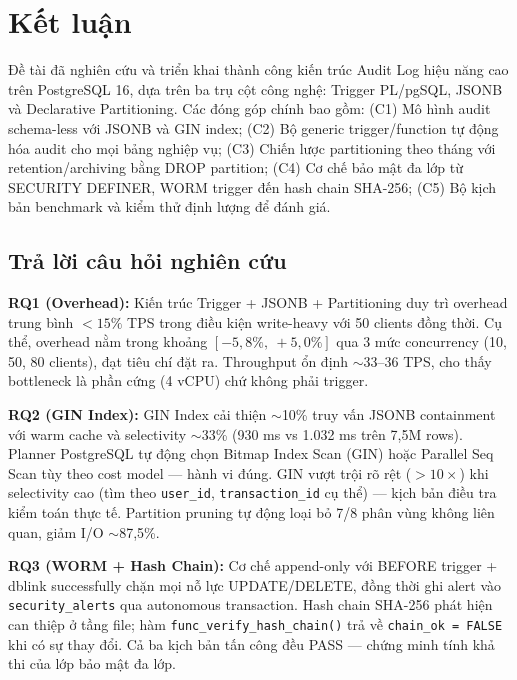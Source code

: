 \section{Kết luận}

Đề tài đã nghiên cứu và triển khai thành công kiến trúc Audit Log hiệu năng cao trên PostgreSQL 16, dựa trên ba trụ cột công nghệ: Trigger PL/pgSQL, JSONB và Declarative Partitioning. Các đóng góp chính bao gồm: (C1) Mô hình audit schema-less với JSONB và GIN index; (C2) Bộ generic trigger/function tự động hóa audit cho mọi bảng nghiệp vụ; (C3) Chiến lược partitioning theo tháng với retention/archiving bằng DROP partition; (C4) Cơ chế bảo mật đa lớp từ SECURITY DEFINER, WORM trigger đến hash chain SHA-256; (C5) Bộ kịch bản benchmark và kiểm thử định lượng để đánh giá.

\subsection{Trả lời câu hỏi nghiên cứu}

\textbf{RQ1 (Overhead):} Kiến trúc Trigger + JSONB + Partitioning duy trì overhead trung bình $< 15\%$ TPS trong điều kiện write-heavy với 50 clients đồng thời. Cụ thể, overhead nằm trong khoảng $[-5,8\%,\ +5,0\%]$ qua 3 mức concurrency (10, 50, 80 clients), đạt tiêu chí đặt ra. Throughput ổn định $\sim$33--36 TPS, cho thấy bottleneck là phần cứng (4 vCPU) chứ không phải trigger.

\textbf{RQ2 (GIN Index):} GIN Index cải thiện $\sim$10\% truy vấn JSONB containment với warm cache và selectivity $\sim$33\% (930 ms vs 1.032 ms trên 7,5M rows). Planner PostgreSQL tự động chọn Bitmap Index Scan (GIN) hoặc Parallel Seq Scan tùy theo cost model --- hành vi đúng. GIN vượt trội rõ rệt ($>10\times$) khi selectivity cao (tìm theo \texttt{user\_id}, \texttt{transaction\_id} cụ thể) --- kịch bản điều tra kiểm toán thực tế. Partition pruning tự động loại bỏ 7/8 phân vùng không liên quan, giảm I/O $\sim$87,5\%.

\begin{sloppypar}\textbf{RQ3 (WORM + Hash Chain):} Cơ chế append-only với BEFORE trigger + dblink successfully chặn mọi nỗ lực UPDATE/DELETE, đồng thời ghi alert vào \texttt{security\_alerts} qua autonomous transaction. Hash chain SHA-256 phát hiện can thiệp ở tầng file; hàm \texttt{func\_verify\_hash\_chain()} trả về \texttt{chain\_ok = FALSE} khi có sự thay đổi. Cả ba kịch bản tấn công đều PASS --- chứng minh tính khả thi của lớp bảo mật đa lớp.\end{sloppypar}

